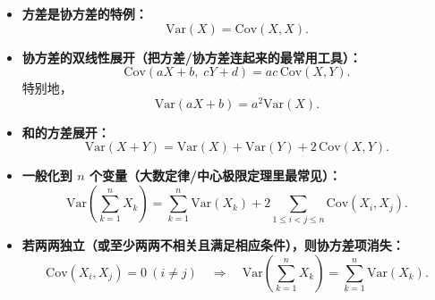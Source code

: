 \begin{definition}[协方差与方差]
  \begin{itemize}
  \item \textbf{方差是协方差的特例：}
  \[
    \mathrm{Var}(X)=\mathrm{Cov}(X,X).
  \]

  \item \textbf{协方差的双线性展开（把方差/协方差连起来的最常用工具）：}
  \[
    \mathrm{Cov}(aX+b,\;cY+d)=ac\,\mathrm{Cov}(X,Y).
  \]
  特别地，
  \[
    \mathrm{Var}(aX+b)=a^2\mathrm{Var}(X).
  \]

  \item \textbf{和的方差展开：}
  \[
    \mathrm{Var}(X+Y)=\mathrm{Var}(X)+\mathrm{Var}(Y)+2\,\mathrm{Cov}(X,Y).
  \]

  \item \textbf{一般化到 $n$ 个变量（大数定律/中心极限定理里最常见）：}
  \[
    \mathrm{Var}\!\left(\sum_{k=1}^n X_k\right)
    =
    \sum_{k=1}^n \mathrm{Var}(X_k)
    +2\sum_{1\le i<j\le n}\mathrm{Cov}(X_i,X_j).
  \]

  \item \textbf{若两两独立（或至少两两不相关且满足相应条件），则协方差项消失：}
  \[
    \mathrm{Cov}(X_i,X_j)=0\ (i\ne j)
    \quad\Longrightarrow\quad
    \mathrm{Var}\!\left(\sum_{k=1}^n X_k\right)=\sum_{k=1}^n \mathrm{Var}(X_k).
  \]
\end{itemize}  
\end{definition}
